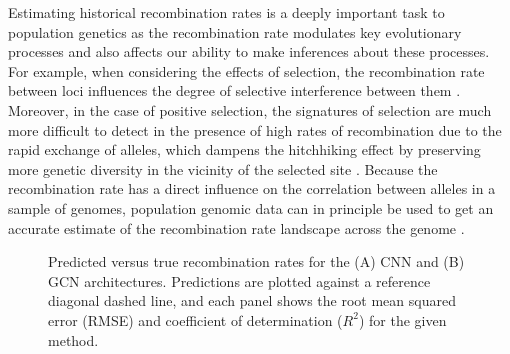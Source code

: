 Estimating historical recombination rates is a deeply important task to population genetics as the recombination rate modulates key evolutionary processes and also affects our ability to make inferences about these processes. For example, when considering the effects of selection, the recombination rate between loci influences the degree of selective interference between them \cite{hillEffectLinkageLimits1966}. Moreover, in the case of positive selection, the signatures of selection are much more difficult to detect in the presence of high rates of recombination due to the rapid exchange of alleles, which dampens the hitchhiking effect by preserving more genetic diversity in the vicinity of the selected site \cite{shrinerPotentialImpactRecombination2003}. Because the recombination rate has a direct influence on the correlation between alleles in a sample of genomes, population genomic data can in principle be used to get an accurate estimate of the recombination rate landscape across the genome \cite{adrionPredictingLandscapeRecombination2020,autonRecombinationRateEstimation2007,chanGenomeWideFineScaleRecombination2012,gaoNewSoftwareFast2016,hudsonTwolocusSamplingDistributions2001}. 

\begin{figure}
    \centering
    \caption[Predicted versus true recombination rates for the (A) CNN and (B) GCN architectures]{Predicted versus true recombination rates for the (A) CNN and (B) GCN architectures. Predictions are plotted against a reference diagonal dashed line, and each panel shows the root mean squared error (RMSE) and coefficient of determination ($R^2$) for the given method.}
    \label{fig:enter-label}
\end{figure}

